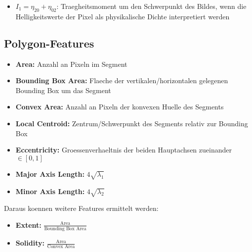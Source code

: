 \begin{itemize}
  \item $I_1 = \eta_{20} + \eta_{02}$: Traegheitsmoment um den Schwerpunkt des Bildes, wenn die Helligkeitswerte der Pixel als physikalische Dichte interpretiert werden
\end{itemize}

\subsection{Polygon-Features}

\begin{itemize}
  \item \textbf{Area:} Anzahl an Pixeln im Segment
  \item \textbf{Bounding Box Area:} Flaeche der vertikalen/horizontalen gelegenen Bounding Box um das Segment
  \item \textbf{Convex Area:} Anzahl an Pixeln der konvexen Huelle des Segments
  \item \textbf{Local Centroid:} Zentrum/Schwerpunkt des Segments relativ zur Bounding Box
  \item \textbf{Eccentricity:} Groessenverhaeltnis der beiden Hauptachsen zueinander $\in [0, 1]$
  \item \textbf{Major Axis Length:} $4 \sqrt{\lambda_1}$
  \item \textbf{Minor Axis Length:} $4 \sqrt{\lambda_2}$
\end{itemize}

Daraus koennen weitere Features ermittelt werden:

\begin{itemize}
  \item \textbf{Extent:} $\frac{\text{Area}}{\text{Bounding Box Area}}$
  \item \textbf{Solidity:} $\frac{\text{Area}}{\text{Convex Area}}$
\end{itemize}
